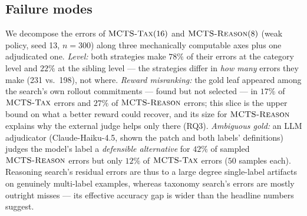 \subsection{Failure modes}
We decompose the errors of $\textsc{MCTS-Tax}(16)$ and $\textsc{MCTS-Reason}(8)$ (weak policy, seed
13, $n{=}300$) along three mechanically computable axes plus one adjudicated
one. \emph{Level:} both strategies make $78\%$ of their errors at the category
level and $22\%$ at the sibling level --- the strategies differ in \emph{how
many} errors they make (231 vs.\ 198), not where. \emph{Reward misranking:} the
gold leaf appeared among the search's own rollout commitments --- found but not
selected --- in $17\%$ of $\textsc{MCTS-Tax}$ errors and $27\%$ of $\textsc{MCTS-Reason}$ errors;
this slice is the upper bound on what a better reward could recover, and its
size for $\textsc{MCTS-Reason}$ explains why the external judge helps only there (RQ3).
\emph{Ambiguous gold:} an LLM adjudicator (Claude-Haiku-4.5, shown the patch
and both labels' definitions) judges the model's label a \emph{defensible
alternative} for $42\%$ of sampled $\textsc{MCTS-Reason}$ errors but only $12\%$ of
$\textsc{MCTS-Tax}$ errors ($50$ samples each). Reasoning search's residual errors are
thus to a large degree single-label artifacts on genuinely multi-label
examples, whereas taxonomy search's errors are mostly outright misses ---
its effective accuracy gap is wider than the headline numbers suggest.

